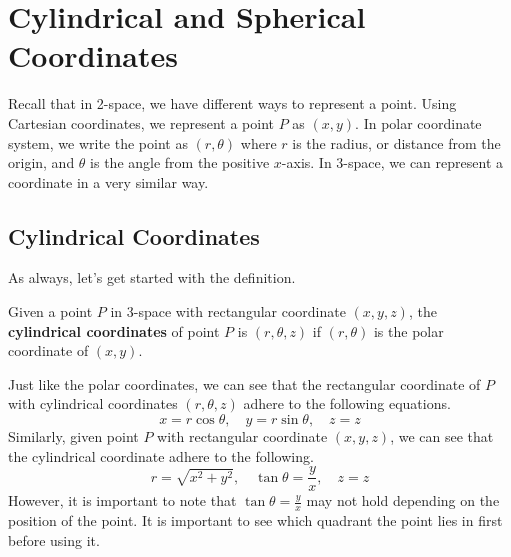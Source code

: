 \documentclass[../../../main.tex]{subfiles}
\begin{document}
\section{Cylindrical and Spherical Coordinates}

Recall that in 2-space, we have different ways to represent
a point. Using Cartesian coordinates, we represent a point $P$
as $(x, y)$. In polar coordinate system, we write the point
as $(r, \theta)$ where $r$ is the radius, or distance from the
origin, and $\theta$ is the angle from the positive $x$-axis.
In 3-space, we can represent a coordinate in a very similar way.

\subsection{Cylindrical Coordinates}

As always, let's get started with the definition.

\begin{definition}{}{}
Given a point $P$ in 3-space with rectangular coordinate $(x,y,z)$,
the \textbf{cylindrical coordinates} of point $P$ is $(r, \theta, z)$
if $(r, \theta)$ is the polar coordinate of $(x, y)$.
\end{definition}

Just like the polar coordinates, we can see that the rectangular
coordinate of $P$ with cylindrical coordinates $(r, \theta, z)$
adhere to the following equations.
\[
x = r\cos\theta, \quad
y = r\sin\theta, \quad
z = z
\]
Similarly, given point $P$ with rectangular coordinate $(x,y,z)$,
we can see that the cylindrical coordinate adhere to the following.
\[
r = \sqrt{x^2 + y^2}, \quad
\tan\theta = \frac{y}{x}, \quad
z = z
\]
However, it is important to note that $\tan\theta = \frac{y}{x}$
may not hold depending on the position of the point. It is important
to see which quadrant the point lies in first before using it.
\end{document}

